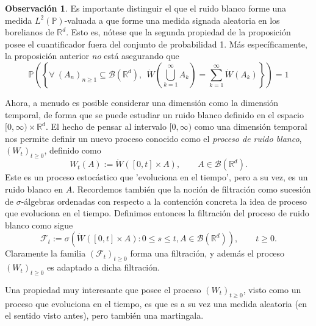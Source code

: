 \documentclass[letterpaper,twoside]{book}
\newcommand{\R}{\mathbb{R}}
\newcommand{\F}{\mathcal{F}}
\newcommand{\B}{\mathcal{B}}
\renewcommand{\P}{\mathbb{P}}
\newcommand{\W}{\dot{W}}
\newcommand{\1}{\mathds{1}}
\theoremstyle{definition}
\theoremstyle{definition}
\theoremstyle{definition}
\theoremstyle{definition}
\theoremstyle{definition}
\newtheorem{obs}{Observación}
\theoremstyle{definition}
\theoremstyle{definition}
\begin{document}
  \begin{obs}
    Es importante distinguir el que el ruido blanco forme una medida $L^{2}(\P)$-valuada a que forme una medida signada aleatoria en los borelianos de $\R^d$. Esto es, nótese que la segunda propiedad de la proposición posee el cuantificador fuera del conjunto de probabilidad 1. Más específicamente, la proposición anterior \textit{no} está asegurando que 
    \[
    \P\left(\left\{\forall \ (A_n)_{n\geq1}\subseteq\B(\R^{d}), \ \ \W \left(\bigcup_{k=1}^\infty A_k\right)=\sum_{k=1}^{\infty}\W(A_k)\right\}\right)=1  
    \]
 \end{obs}
Ahora, a menudo es posible considerar una dimensión como la dimensión temporal, de forma que se puede estudiar un ruido blanco definido en el espacio $[0,\infty)\times\R^{d}$. El hecho de pensar al intervalo $[0,\infty)$ como una dimensión temporal nos permite definir un nuevo proceso conocido como el \textit{proceso de ruido blanco}, $(W_t)_{t\geq0}$, definido como 
\[
W_t(A):=\W \left([0,t]\times A\right), \qquad A\in \B(\R^{d}).    
\]
Este es un proceso estocástico que 'evoluciona en el tiempo', pero a su vez, es un ruido blanco en $A$. Recordemos también que la noción de filtración como sucesión de $\sigma$-álgebras ordenadas con respecto a la contención concreta la idea de proceso que evoluciona en el tiempo. Definimos entonces la filtración del proceso de ruido blanco como sigue
\[
\F_t:=\sigma \left(\W([0,t]\times A):0\leq s\leq t, A\in \B(\R^{d})\right), \qquad t\geq0.    
\]
Claramente la familia $(\F_t)_{t\geq0}$ forma una filtración, y además el proceso $(W_t)_{t\geq0}$ es adaptado a dicha filtración.

Una propiedad muy interesante que posee el proceso $(W_t)_{t\geq0}$, visto como un proceso que evoluciona en el tiempo, es que es a su vez una medida aleatoria (en el sentido visto antes), pero también una martingala. 
\end{document}

